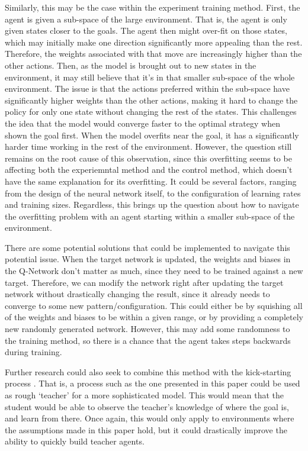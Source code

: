 \documentclass[12pt,letterpaper]{article}
\begin{document}
Similarly, this may be the case within the experiment training method.
First, the agent is given a sub-space of the large environment.
That is, the agent is only given states closer to the goals.
The agent then might over-fit on those states, which may initially make one direction significantly more appealing than the rest.
Therefore, the weights associated with that move are increasingly higher than the other actions.
Then, as the model is brought out to new states in the environment, it may still believe that it's in that smaller sub-space of the whole environment.
The issue is that the actions preferred within the sub-space have significantly higher weights than the other actions, making it hard to change the policy for only one state without changing the rest of the states.
This challenges the idea that the model would converge faster to the optimal strategy when shown the goal first.
When the model overfits near the goal, it has a significantly harder time working in the rest of the environment.
However, the question still remains on the root cause of this observation, since this overfitting seems to be affecting both the experiemntal method and the control method, which doesn't have the same explanation for its overfitting.
It could be several factors, ranging from the design of the neural network itself, to the configuration of learning rates and training sizes.
Regardless, this brings up the question about how to navigate the overfitting problem with an agent starting within a smaller sub-space of the environment.

There are some potential solutions that could be implemented to navigate this potential issue.
When the target network is updated, the weights and biases in the Q-Network don't matter as much, since they need to be trained against a new target.
Therefore, we can modify the network right after updating the target network without drastically changing the result, since it already needs to converge to some new pattern/configuration.
This could either be by squishing all of the weights and biases to be within a given range, or by providing a completely new randomly generated network.
However, this may add some randomness to the training method, so there is a chance that the agent takes steps backwards during training.

Further research could also seek to combine this method with the kick-starting process \cite{article_kickstart_deep_reinforcement_learning}.
That is, a process such as the one presented in this paper could be used as rough `teacher' for a more sophisticated model.
This would mean that the student would be able to observe the teacher's knowledge of where the goal is, and learn from there.
Once again, this would only apply to environments where the assumptions made in this paper hold, but it could drastically improve the ability to quickly build teacher agents.
\end{document}
